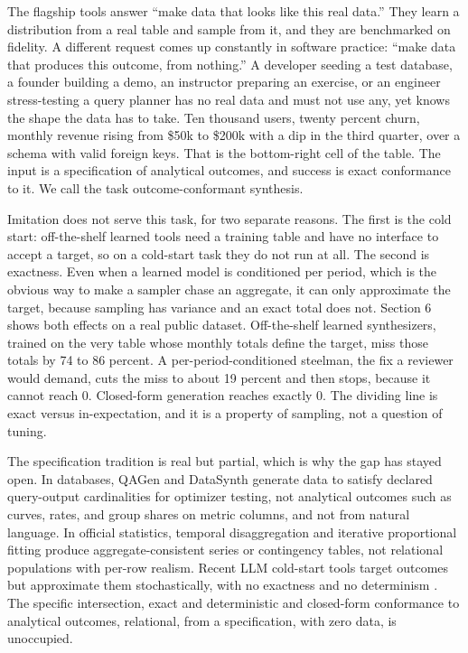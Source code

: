 The flagship tools answer ``make data that looks like this real data.''
\cite{patki2016sdv,xu2019ctgan,kotelnikov2023tabddpm} They learn a
distribution from a real table and sample from it, and they are
benchmarked on fidelity. A different request comes up constantly in
software practice: ``make data that produces this outcome, from
nothing.'' A developer seeding a test database, a founder building a
demo, an instructor preparing an exercise, or an engineer stress-testing
a query planner has no real data and must not use any, yet knows the
shape the data has to take. Ten thousand users, twenty percent churn,
monthly revenue rising from \$50k to \$200k with a dip in the third
quarter, over a schema with valid foreign keys. That is the bottom-right
cell of the table. The input is a specification of analytical outcomes,
and success is exact conformance to it. We call the task
outcome-conformant synthesis.

Imitation does not serve this task, for two separate reasons. The first
is the cold start: off-the-shelf learned tools need a training table and
have no interface to accept a target, so on a cold-start task they do
not run at all. The second is exactness. Even when a learned model is
conditioned per period, which is the obvious way to make a sampler chase
an aggregate, it can only approximate the target, because sampling has
variance and an exact total does not. Section 6 shows both effects on a
real public dataset. Off-the-shelf learned synthesizers, trained on the
very table whose monthly totals define the target, miss those totals by
74 to 86 percent. A per-period-conditioned steelman, the fix a reviewer
would demand, cuts the miss to about 19 percent and then stops, because
it cannot reach 0. Closed-form generation reaches exactly 0. The
dividing line is exact versus in-expectation, and it is a property of
sampling, not a question of tuning.

The specification tradition is real but partial, which is why the gap
has stayed open. In databases, QAGen \cite{binnig2007qagen} and
DataSynth \cite{arasu2011datasynth} generate data to satisfy declared
query-output cardinalities for optimizer testing, not analytical
outcomes such as curves, rates, and group shares on metric columns, and
not from natural language. In official statistics, temporal
disaggregation \cite{denton1971} and iterative proportional fitting
\cite{deming1940ipf} produce aggregate-consistent series or contingency
tables, not relational populations with per-row realism. Recent LLM
cold-start tools target outcomes but approximate them stochastically,
with no exactness and no determinism \cite{nemo_data_designer}. The
specific intersection, exact and deterministic and closed-form
conformance to analytical outcomes, relational, from a specification,
with zero data, is unoccupied.

